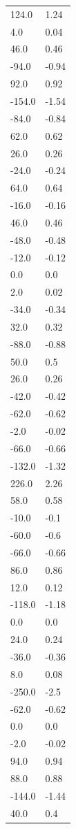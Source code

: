 \begin{longtable}{ll}
124.0 & 1.24 \\
4.0 & 0.04 \\
46.0 & 0.46 \\
-94.0 & -0.94 \\
92.0 & 0.92 \\
-154.0 & -1.54 \\
-84.0 & -0.84 \\
62.0 & 0.62 \\
26.0 & 0.26 \\
-24.0 & -0.24 \\
64.0 & 0.64 \\
-16.0 & -0.16 \\
46.0 & 0.46 \\
-48.0 & -0.48 \\
-12.0 & -0.12 \\
0.0 & 0.0 \\
2.0 & 0.02 \\
-34.0 & -0.34 \\
32.0 & 0.32 \\
-88.0 & -0.88 \\
50.0 & 0.5 \\
26.0 & 0.26 \\
-42.0 & -0.42 \\
-62.0 & -0.62 \\
-2.0 & -0.02 \\
-66.0 & -0.66 \\
-132.0 & -1.32 \\
226.0 & 2.26 \\
58.0 & 0.58 \\
-10.0 & -0.1 \\
-60.0 & -0.6 \\
-66.0 & -0.66 \\
86.0 & 0.86 \\
12.0 & 0.12 \\
-118.0 & -1.18 \\
0.0 & 0.0 \\
24.0 & 0.24 \\
-36.0 & -0.36 \\
8.0 & 0.08 \\
-250.0 & -2.5 \\
-62.0 & -0.62 \\
0.0 & 0.0 \\
-2.0 & -0.02 \\
94.0 & 0.94 \\
88.0 & 0.88 \\
-144.0 & -1.44 \\
40.0 & 0.4 \\

\end{longtable}
